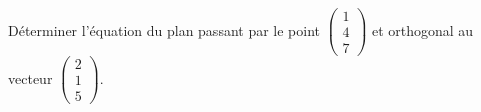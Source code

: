 
\begin{exercice}\label{exoOutilsMath-0071}

    Déterminer l'équation du plan passant par le point $\begin{pmatrix}
        1    \\ 
        4    \\ 
        7    
    \end{pmatrix}$ et orthogonal au vecteur $\begin{pmatrix}
        2    \\ 
        1    \\ 
        5    
    \end{pmatrix}$.

\end{exercice}

